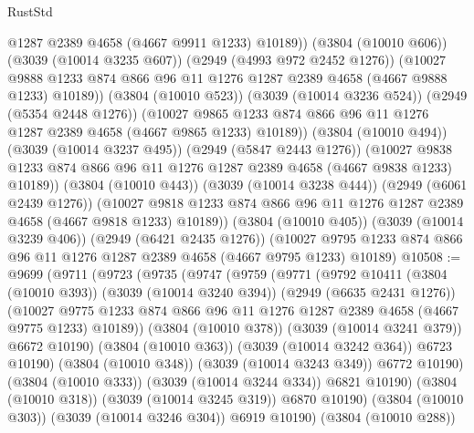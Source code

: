 \begin{lexlean}{RustStd}
\begin{coremodule}
                @1287
                @2389
                @4658
                (@4667 @9911 @1233)
                @10189))
            (@3804 (@10010 @606))
            (@3039 (@10014 @3235 @607))
            (@2949 (@4993 @972 @2452 @1276))
            (@10027
              @9888
              @1233
              @874
              @866
              @96
              @11
              @1276
              @1287
              @2389
              @4658
              (@4667 @9888 @1233)
              @10189))
          (@3804 (@10010 @523))
          (@3039 (@10014 @3236 @524))
          (@2949 (@5354 @2448 @1276))
          (@10027 @9865 @1233 @874 @866 @96 @11 @1276 @1287 @2389 @4658 (@4667 @9865 @1233) @10189))
        (@3804 (@10010 @494))
        (@3039 (@10014 @3237 @495))
        (@2949 (@5847 @2443 @1276))
        (@10027 @9838 @1233 @874 @866 @96 @11 @1276 @1287 @2389 @4658 (@4667 @9838 @1233) @10189))
      (@3804 (@10010 @443))
      (@3039 (@10014 @3238 @444))
      (@2949 (@6061 @2439 @1276))
      (@10027 @9818 @1233 @874 @866 @96 @11 @1276 @1287 @2389 @4658 (@4667 @9818 @1233) @10189))
    (@3804 (@10010 @405))
    (@3039 (@10014 @3239 @406))
    (@2949 (@6421 @2435 @1276))
    (@10027 @9795 @1233 @874 @866 @96 @11 @1276 @1287 @2389 @4658 (@4667 @9795 @1233) @10189)
@10508 := @9699
    (@9711
      (@9723
        (@9735
          (@9747
            (@9759
              (@9771
                (@9792
                  @10411
                  (@3804 (@10010 @393))
                  (@3039 (@10014 @3240 @394))
                  (@2949 (@6635 @2431 @1276))
                  (@10027
                    @9775
                    @1233
                    @874
                    @866
                    @96
                    @11
                    @1276
                    @1287
                    @2389
                    @4658
                    (@4667 @9775 @1233)
                    @10189))
                (@3804 (@10010 @378))
                (@3039 (@10014 @3241 @379))
                @6672
                @10190)
              (@3804 (@10010 @363))
              (@3039 (@10014 @3242 @364))
              @6723
              @10190)
            (@3804 (@10010 @348))
            (@3039 (@10014 @3243 @349))
            @6772
            @10190)
          (@3804 (@10010 @333))
          (@3039 (@10014 @3244 @334))
          @6821
          @10190)
        (@3804 (@10010 @318))
        (@3039 (@10014 @3245 @319))
        @6870
        @10190)
      (@3804 (@10010 @303))
      (@3039 (@10014 @3246 @304))
      @6919
      @10190)
    (@3804 (@10010 @288))

\end{coremodule}
\end{lexlean}
